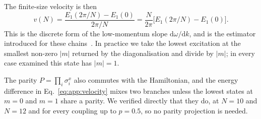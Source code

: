 The finite-size velocity is then
\begin{equation}
  v(N)
  = \frac{E_1(2\pi/N)-E_1(0)}{2\pi/N}
  = \frac{N}{2\pi}\big[E_1(2\pi/N)-E_1(0)\big].
  \label{eq:app:velocity}
\end{equation}
This is the discrete form of the low-momentum slope $\mathrm{d}\omega/\mathrm{d}k$, and is the estimator introduced for these chains~\cite{alcaraz2016}. In practice we take the lowest excitation at the smallest non-zero $|m|$ returned by the diagonalisation and divide by $|m|$; in every case examined this state has $|m|=1$.

The parity $P=\prod_i\sigma^x_i$ also commutes with the Hamiltonian, and the energy difference in Eq.~\eqref{eq:app:velocity} mixes two branches unless the lowest states at $m=0$ and $m=1$ share a parity. We verified directly that they do, at $N=10$ and $N=12$ and for every coupling up to $p=0.5$, so no parity projection is needed.

